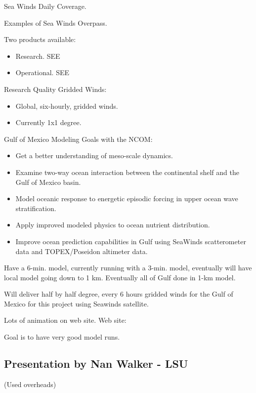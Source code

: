 Sea Winds Daily Coverage.

Examples of Sea Winds Overpass.

Two products available:
\begin{itemize}
\item     Research. SEE 
\item     Operational. SEE 
\end{itemize}

Research Quality Gridded Winds:
\begin{itemize}
\item     Global, six-hourly, gridded winds.
\item     Currently 1x1 degree.
\end{itemize}

Gulf of Mexico Modeling Goals with the NCOM:
\begin{itemize}
\item     Get a better understanding of meso-scale dynamics.
\item     Examine two-way ocean interaction between the continental shelf and the Gulf of Mexico basin.
\item     Model oceanic response to energetic episodic forcing in upper ocean wave stratification.
\item     Apply improved modeled physics to ocean nutrient distribution.
\item     Improve ocean prediction capabilities in Gulf using SeaWinds scatterometer data and 
TOPEX/Poseidon altimeter data.
\end{itemize}

Have a 6-min. model, currently running with a 3-min. model, eventually will have local model 
going down to 1 km. Eventually all of Gulf done in 1-km model.

Will deliver half by half degree, every 6 hours gridded winds for the Gulf of Mexico for this 
project using Seawinds satellite.
 
Lots of animation on web site.
Web site:     

Goal is to have very good model runs.

\subsection{Presentation by Nan Walker - LSU}

(Used overheads)

